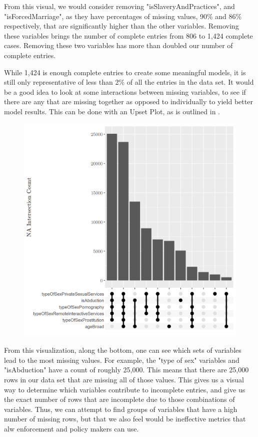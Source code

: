 \documentclass{article} %
\begin{document}
From this visual, we would consider removing "isSlaveryAndPractices", and "isForcedMarriage", as they have percentages of missing values, 90\% and 86\% respectively, that are significantly higher than the other variables. Removing these variables brings the number of complete entries from 806 to 1,424 complete cases. Removing these two variables has more than doubled our number of complete entries.

While 1,424 is enough complete entries to create some meaningful models, it is still only representative of less than 2\% of all the entries in the data set. It would be a good idea to look at some interactions between missing variables, to see if there are any that are missing together as opposed to individually to yield better model results. This can be done with an Upset Plot, as is outlined in \cite{UpsetPlot}.

\begin{figure}[H]
	\includegraphics[width = \textwidth]{UpsetPlt1}
\end{figure}

From this visualization, along the bottom, one can see which sets of variables lead to the most missing values. For example, the "type of sex" variables and "isAbduction" have a count of roughly 25,000. This means that there are 25,000 rows in our data set that are missing all of those values. This gives us a visual way to determine which variables contribute to incomplete entries, and give us the exact number of rows that are incomplete due to those combinations of variables. Thus, we can attempt to find groups of variables that have a high number of missing rows, but that we also feel would be ineffective metrics that alw enforcement and policy makers can use. 
\end{document}
